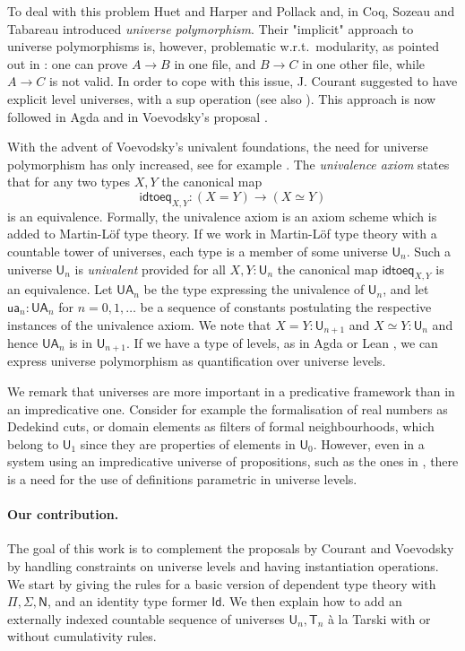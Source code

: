 \documentclass{easychair}
\newcommand{\Id}{\mathsf{Id}}
\def\NN{\mathsf{N}}
\def\UU{\mathsf{U}}
\newcommand{\T}{\mathsf{T}}
\newcommand{\idtoeq}{\mathsf{idtoeq}}
\newcommand{\ua}{\mathsf{ua}}
\newcommand{\UA}{\mathsf{UA}}
\begin{document}
 To deal with this problem Huet \cite{Huet87} and
 Harper and Pollack \cite{HarperP91} and, in Coq, Sozeau and Tabareau 
 \cite{SozeauTabareau:coq} introduced {\em universe polymorphism}.
 Their "implicit" approach to universe polymorphisms is, however, problematic 
 w.r.t.\ modularity, as pointed out in \cite{Courant02,Simpson04}: 
 one can prove $A\rightarrow B$ in one file, and $B\rightarrow C$ in one other file, while
$A\rightarrow C$ is not valid. In order to cope with this issue, J. Courant \cite{Courant02}
suggested to have explicit level universes, with a sup operation (see also \cite{herbelin05}).
This approach is now followed in Agda and in Voevodsky's proposal \cite{VV}.

With the advent of Voevodsky's univalent foundations, the need for universe polymorphism 
has only increased, see for example \cite{VV}. 
The {\em univalence axiom} states that for any two types $X,Y$ the canonical map
$$
\idtoeq_{X,Y} : (X=Y)\to (X\simeq Y)
$$
is an equivalence.
Formally, the univalence axiom is an axiom scheme which is added to Martin-Löf type theory. 
If we work in Martin-Löf type theory with a countable tower of universes, 
each type is a member of some universe $\UU_n$. 
Such a universe $\UU_n$ is {\em univalent} provided for all $X,Y : \UU_n$ the 
canonical map $\idtoeq_{X,Y}$ is an equivalence. 
Let $\UA_n$ be the type expressing the univalence of $\UU_n$, and let
$\ua_n : \UA_n$ for $n = 0,1,\ldots$ be a sequence of constants postulating 
the respective instances of the univalence axiom. 
We note that $X = Y : \UU_{n+1}$ and $X\simeq Y : \UU_n$ and hence $\UA_n$ is in $\UU_{n+1}$.
If we have a type of levels, as in Agda \cite{agda-manual} or Lean \cite{moura:lean},
we can express universe polymorphism as quantification over universe levels.

We remark that universes are more important in a predicative framework 
than in an impredicative one.
Consider for example the formalisation of real numbers as Dedekind cuts, 
or domain elements as filters of formal neighbourhoods, 
which belong to $\UU_1$ since they are properties of elements in $\UU_0$.
However, even in a system using an impredicative universe of propositions,
such as the ones in \cite{Huet87,moura:lean}, there is a need for the use of 
definitions parametric in universe levels.

\paragraph{Our contribution.}
  The goal of this work is to complement the proposals by Courant \cite{Courant02}
  and Voevodsky \cite{VV} by handling constraints on universe levels 
  and having instantiation operations.
  We start by giving the rules for a basic version of dependent type theory with
  $\Pi, \Sigma, \NN$, and an identity type former $\Id$.
  We then explain how to add an externally indexed countable sequence of 
  universes $\UU_n, \T_n$ \`a la Tarski with or without cumulativity rules. 
  
\end{document}
